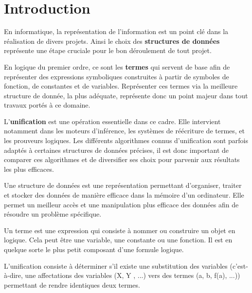 \documentclass[11pt]{article}
\begin{document}
\newpage
\section*{Introduction}
\label{introduction}

En informatique, la représentation de l'information est un point clé dans la réalisation de divers projets. Ainsi le choix des \textbf{structures de données} représente une étape cruciale pour le bon déroulement de tout projet. 

En logique du premier ordre, ce sont les \textbf{termes} qui servent de base afin de représenter des expressions symboliques construites à partir de symboles de fonction, de constantes et de variables. Représenter ces termes via la meilleure structure de donnée, la plus adéquate, représente donc un point majeur dans tout travaux portés à ce domaine.

L’\textbf{unification} est une opération essentielle dans ce cadre. Elle intervient notamment dans les moteurs d’inférence, les systèmes de réécriture de termes, et les prouveurs logiques. Les différents algorithmes connus d'unification sont parfois adaptés à certaines structures de données précises, il est donc important de comparer ces algorithmes et de diversifier ses choix pour parvenir aux résultats les plus efficaces.

\vspace{0.5cm}

Une structure de données est une représentation permettant d'organiser, traiter et stocker des données de manière efficace dans la mémoire d'un ordinateur. Elle permet un meilleur accès et une manipulation plus efficace des données afin de résoudre un problème spécifique. 

Un terme est une expression qui consiste à nommer ou construire un objet en logique. Cela peut être une variable, une constante ou une fonction. Il est en quelque sorte le plus petit composant d'une formule logique.

L'unification consiste à déterminer s’il existe
une substitution des variables (c’est-à-dire, une affectations des variables (X, Y , ...) vers des termes
(a, b, f(a), ...)) permettant de rendre identiques deux termes.



\vspace{0.5cm}
\end{document}
